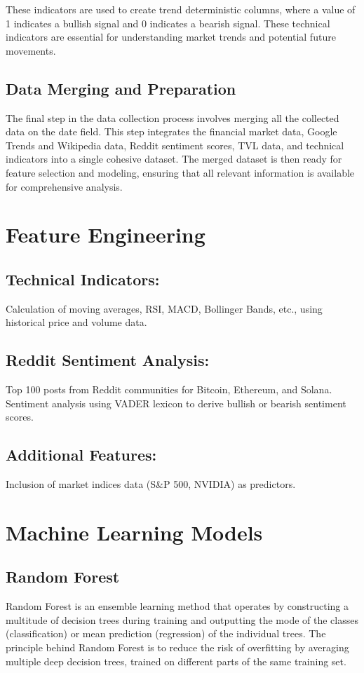 These indicators are used to create trend deterministic columns, where a value of 1 indicates a bullish signal and 0 indicates a bearish signal. 
These technical indicators are essential for understanding market trends and potential future movements.

\subsection{Data Merging and Preparation}
The final step in the data collection process involves merging all the collected data on the date field. This step integrates the financial market data, Google Trends and Wikipedia data,
 Reddit sentiment scores, TVL data, and technical indicators into a single cohesive dataset. The merged dataset is then ready for feature selection and modeling, ensuring that all relevant 
 information is available for comprehensive analysis.




\section{Feature Engineering}

\subsection{Technical Indicators:} Calculation of moving averages, RSI, MACD, Bollinger Bands, etc., using historical price and volume data.
\subsection{Reddit Sentiment Analysis:} Top 100 posts from Reddit communities for Bitcoin, Ethereum, and Solana. Sentiment analysis using VADER lexicon to derive bullish or bearish sentiment scores.
\subsection{Additional Features:} Inclusion of market indices data (S\&P 500, NVIDIA) as predictors.


\section{Machine Learning Models}
\subsection{Random Forest}
Random Forest is an ensemble learning method that operates by constructing a multitude of decision trees during training and outputting the mode of the classes (classification) or mean prediction (regression) of the individual trees. The principle behind Random Forest is to reduce the risk of overfitting by averaging multiple deep decision trees, trained on different parts of the same training set.

